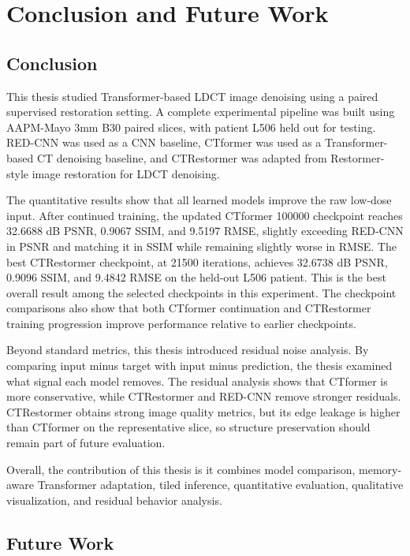 \chapter{Conclusion and Future Work}

\section{Conclusion}

This thesis studied Transformer-based LDCT image denoising using a paired supervised restoration setting. A complete experimental pipeline was built using AAPM-Mayo 3mm B30 paired slices, with patient L506 held out for testing. RED-CNN was used as a CNN baseline, CTformer was used as a Transformer-based CT denoising baseline, and CTRestormer was adapted from Restormer-style image restoration for LDCT denoising.

The quantitative results show that all learned models improve the raw low-dose input. After continued training, the updated CTformer 100000 checkpoint reaches 32.6688 dB PSNR, 0.9067 SSIM, and 9.5197 RMSE, slightly exceeding RED-CNN in PSNR and matching it in SSIM while remaining slightly worse in RMSE. The best CTRestormer checkpoint, at 21500 iterations, achieves 32.6738 dB PSNR, 0.9096 SSIM, and 9.4842 RMSE on the held-out L506 patient. This is the best overall result among the selected checkpoints in this experiment. The checkpoint comparisons also show that both CTformer continuation and CTRestormer training progression improve performance relative to earlier checkpoints.

Beyond standard metrics, this thesis introduced residual noise analysis. By comparing input minus target with input minus prediction, the thesis examined what signal each model removes. The residual analysis shows that CTformer is more conservative, while CTRestormer and RED-CNN remove stronger residuals. CTRestormer obtains strong image quality metrics, but its edge leakage is higher than CTformer on the representative slice, so structure preservation should remain part of future evaluation.

Overall, the contribution of this thesis is it combines model comparison, memory-aware Transformer adaptation, tiled inference, quantitative evaluation, qualitative visualization, and residual behavior analysis.

\section{Future Work}

